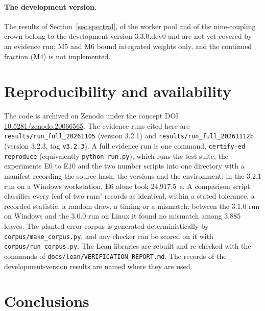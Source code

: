 \documentclass[11pt,a4paper]{article}
\newcommand{\code}[1]{\texttt{#1}}
\begin{document}
\paragraph{The development version.}
The results of Section~\ref{sec:spectral}, of the worker pool and of the nine-coupling crown belong to the development
version 3.3.0.dev0 and are not yet covered by an evidence run; M5 and M6 bound integrated weights only, and the
continued fraction (M4) is not implemented.

\section{Reproducibility and availability}
\label{sec:repro}

The code is archived on Zenodo under the concept DOI \href{https://doi.org/10.5281/zenodo.20066565}{10.5281/zenodo.20066565}.
The evidence runs cited here are \code{results/run\_full\_20261105} (version 3.2.1) and
\code{results/run\_full\_20261112b} (version 3.2.3, tag \code{v3.2.3}). A full evidence run is one command,
\code{certify-ed reproduce} (equivalently \code{python run.py}), which runs the test suite, the experiments E0 to E10
and the two number scripts into one directory with a manifest recording the source hash, the versions and the
environment; in the 3.2.1 run on a Windows workstation, E6 alone took 24,917.5~s. A
comparison script classifies every leaf of two runs' records as identical, within a stated tolerance, a recorded
statistic, a random draw, a timing or a mismatch; between the 3.1.0 run on Windows and the 3.0.0 run on Linux it
found no mismatch among 3,885 leaves. The planted-error corpus is generated deterministically by
\code{corpus/make\_corpus.py}, and any checker can be scored on it with \code{corpus/run\_corpus.py}. The Lean libraries
are rebuilt and re-checked with the commands of \code{docs/lean/VERIFICATION\_REPORT.md}. The records of the
development-version results are named where they are used.

\section{Conclusions}
\label{sec:conclusions}
\end{document}
